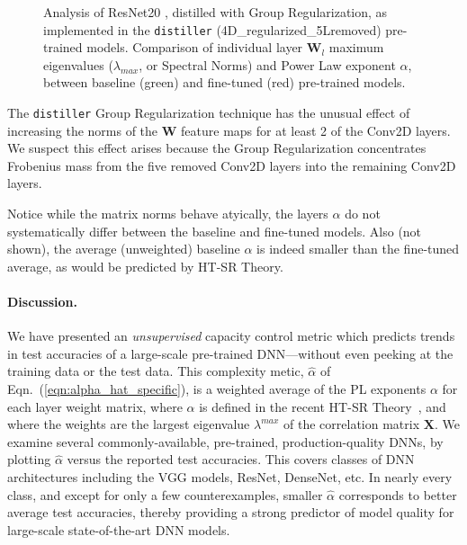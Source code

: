 \begin{figure}[H]
{      \label{fig:resnet204Dmaxev}
   }
   \vspace{-3mm}
   \caption{
     Analysis of ResNet20 , distilled with Group Regularization, as implemented in the \texttt{distiller}  (4D\_regularized\_5Lremoved) pre-trained models.  
     Comparison of individual layer $\mathbf{W}_{l}$ maximum eigenvalues ($\lambda_{max}$, or Spectral Norms) and  
     Power Law exponent $\alpha$, between baseline (green) and fine-tuned (red)  pre-trained models.   
           }
   \label{fig:resnet204D5L}
\end{figure}

The \texttt{distiller} Group Regularization technique has the unusual effect of increasing the norms of the $\mathbf{W}$ feature maps for at least 2 of the Conv2D layers.
We suspect this effect arises because the Group Regularization concentrates Frobenius mass from the five removed Conv2D layers into the remaining Conv2D layers.

Notice while the matrix norms behave atyically, the layers $\alpha$ do not systematically differ between the baseline and fine-tuned models.
Also (not shown), the average (unweighted) baseline $\alpha$ is indeed smaller than the fine-tuned average, as would be predicted by HT-SR Theory.

\vspace{-2mm}
\paragraph{Discussion.}

We have presented an \emph{unsupervised} capacity control metric which predicts trends in test accuracies of a large-scale pre-trained DNN---without even peeking at the training data or the test data. 
This complexity metic, $\hat{\alpha}$ of Eqn.~(\ref{eqn:alpha_hat_specific}), is a weighted average of the PL exponents $\alpha$ for each layer weight matrix, where $\alpha$ is defined in the recent HT-SR Theory~\cite{MM18_TR,MM19_HTSR_ICML}, and where the weights are the largest eigenvalue $\lambda^{max}$ of the correlation matrix $\mathbf{X}$.  
%
We examine several commonly-available, pre-trained, production-quality DNNs, by plotting $\hat{\alpha}$ versus the reported test accuracies.
This covers classes of DNN architectures including the VGG models, ResNet, DenseNet, etc. 
In nearly every class, and except for only a few counterexamples, smaller $\hat{\alpha}$ corresponds to better average test accuracies, thereby providing a strong predictor of model quality for large-scale state-of-the-art DNN models.

